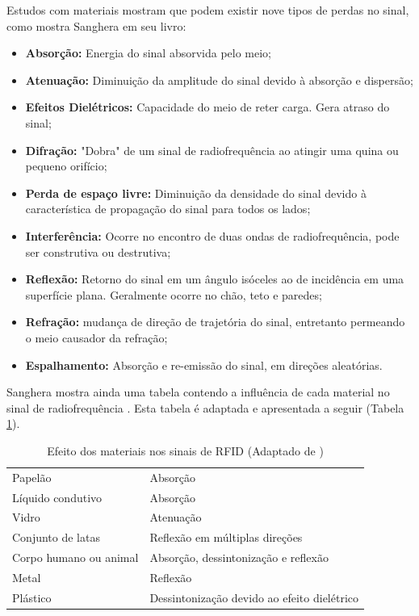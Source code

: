 Estudos com materiais mostram que podem existir nove tipos de perdas no sinal, como mostra Sanghera em seu livro\cite{book:SangheraRFID+}:
\begin{itemize}
    \item \textbf{Absorção:} Energia do sinal absorvida pelo meio;
    \item \textbf{Atenuação:} Diminuição da amplitude do sinal devido à absorção e dispersão;
    \item \textbf{Efeitos Dielétricos:} Capacidade do meio de reter carga. Gera atraso do sinal;
    \item \textbf{Difração:} "Dobra" de um sinal de radiofrequência ao atingir uma quina ou pequeno orifício;
    \item \textbf{Perda de espaço livre:} Diminuição da densidade do sinal devido à característica de propagação do sinal para todos os lados;
    \item \textbf{Interferência:} Ocorre no encontro de duas ondas de radiofrequência, pode ser construtiva ou destrutiva;
    \item \textbf{Reflexão:} Retorno do sinal em um ângulo isóceles ao de incidência em uma superfície plana. Geralmente ocorre no chão, teto e paredes;
    \item \textbf{Refração:} mudança de direção de trajetória do sinal, entretanto permeando o meio causador da refração;
    \item \textbf{Espalhamento:} Absorção e re-emissão do sinal, em direções aleatórias.
\end{itemize}
    
Sanghera mostra ainda uma tabela contendo a influência de cada material no sinal de radiofrequência \cite{book:SangheraRFID+}. Esta tabela é adaptada e apresentada a seguir (Tabela \ref{tab:InterfMateriais}).

\begin{table}[H]
\centering
\caption{Efeito dos materiais nos sinais de RFID (Adaptado de \cite{book:SangheraRFID+})}
\label{tab:InterfMateriais}
\begin{tabular}{p{5cm} p{7cm}}
\hline
\cellcolor{lightgray}{Material} & \cellcolor{lightgray}{Efeito no sinal RF}   \\ \hline
Papelão         &   Absorção        \\
Líquido condutivo    &   Absorção        \\
Vidro           &  Atenuação        \\
Conjunto de latas & Reflexão em múltiplas direções \\
Corpo humano ou animal & Absorção, dessintonização e reflexão \\ 
Metal & Reflexão \\
Plástico & Dessintonização devido ao efeito dielétrico \\ \hline
\end{tabular}
\end{table}

